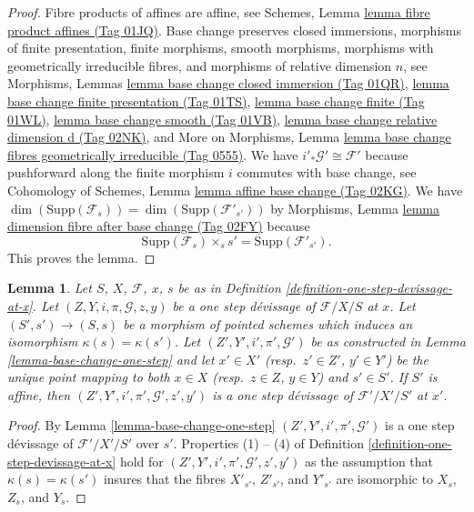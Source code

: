\documentclass{amsart}
\theoremstyle{plain}
\newtheorem{lemma}[subsection]{Lemma}
\theoremstyle{definition}
\theoremstyle{remark}
\numberwithin{equation}{subsection}
\begin{document}
\begin{proof}
Fibre products of affines are affine, see
Schemes, Lemma \href{https://stacks.math.columbia.edu/tag/01JQ}{lemma fibre product affines (Tag 01JQ)}.
Base change preserves
closed immersions,
morphisms of finite presentation,
finite morphisms,
smooth morphisms,
morphisms with geometrically irreducible fibres, and
morphisms of relative dimension $n$, see
Morphisms, Lemmas \href{https://stacks.math.columbia.edu/tag/01QR}{lemma base change closed immersion (Tag 01QR)},
\href{https://stacks.math.columbia.edu/tag/01TS}{lemma base change finite presentation (Tag 01TS)},
\href{https://stacks.math.columbia.edu/tag/01WL}{lemma base change finite (Tag 01WL)},
\href{https://stacks.math.columbia.edu/tag/01VB}{lemma base change smooth (Tag 01VB)},
\href{https://stacks.math.columbia.edu/tag/02NK}{lemma base change relative dimension d (Tag 02NK)}, and
More on Morphisms, Lemma
\href{https://stacks.math.columbia.edu/tag/0555}{lemma base change fibres geometrically irreducible (Tag 0555)}.
We have $i'_*\mathcal{G}' \cong \mathcal{F}'$ because pushforward
along the finite morphism $i$ commutes with base change, see
Cohomology of Schemes, Lemma \href{https://stacks.math.columbia.edu/tag/02KG}{lemma affine base change (Tag 02KG)}.
We have
$\dim(\text{Supp}(\mathcal{F}_s)) = \dim(\text{Supp}(\mathcal{F}'_{s'}))$
by
Morphisms, Lemma \href{https://stacks.math.columbia.edu/tag/02FY}{lemma dimension fibre after base change (Tag 02FY)}
because
$$
\text{Supp}(\mathcal{F}_s) \times_s s' = \text{Supp}(\mathcal{F}'_{s'}).
$$
This proves the lemma.
\end{proof}


\begin{lemma}
\label{lemma-base-change-one-step-at-x}
Let $S$, $X$, $\mathcal{F}$, $x$, $s$ be as in
Definition \ref{definition-one-step-devissage-at-x}.
Let $(Z, Y, i, \pi, \mathcal{G}, z, y)$ be a one step d\'evissage
of $\mathcal{F}/X/S$ at $x$.
Let $(S', s') \to (S, s)$ be a morphism of pointed schemes
which induces an isomorphism $\kappa(s) = \kappa(s')$.
Let $(Z', Y', i', \pi', \mathcal{G}')$ be as constructed in
Lemma \ref{lemma-base-change-one-step}
and let $x' \in X'$ (resp.\ $z' \in Z'$, $y' \in Y'$) be the
unique point mapping to both $x \in X$ (resp.\ $z \in Z$, $y \in Y$)
and $s' \in S'$.
If $S'$ is affine, then $(Z', Y', i', \pi', \mathcal{G}', z', y')$
is a one step d\'evissage of $\mathcal{F}'/X'/S'$ at $x'$.
\end{lemma}

\begin{proof}
By
Lemma \ref{lemma-base-change-one-step}
$(Z', Y', i', \pi', \mathcal{G}')$ is a one step d\'evissage of
$\mathcal{F}'/X'/S'$ over $s'$. Properties (1) -- (4) of
Definition \ref{definition-one-step-devissage-at-x}
hold for $(Z', Y', i', \pi', \mathcal{G}', z', y')$
as the assumption that $\kappa(s) = \kappa(s')$ insures that the fibres
$X'_{s'}$, $Z'_{s'}$, and $Y'_{s'}$ are isomorphic to
$X_s$, $Z_s$, and $Y_s$.
\end{proof}
\end{document}
